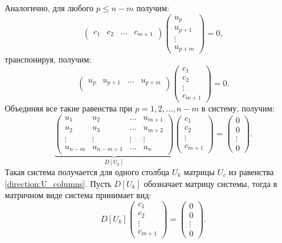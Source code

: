 Аналогично, для любого $p \le n-m$ получим:
\[
    \begin{pmatrix}
        c_1 & c_2 & \dots & c_{m+1}
    \end{pmatrix}
    \begin{pmatrix}
        u_p     \\
        u_{p+1} \\
        \vdots  \\
        u_{p+m}
    \end{pmatrix}
    = 0 ,
\]
транспонируя, получим:
\[
    \begin{pmatrix}
        u_p & u_{p+1} & \dots & u_{p+m} \\
    \end{pmatrix}
    \begin{pmatrix}
        c_1    \\
        c_2    \\
        \vdots \\
        c_{m+1}
    \end{pmatrix}
    = 0 .
\]
Объединяя все такие равенства при $p=1, 2, \dots, n-m$ в систему, получим:
\[
    \underbrace{
        \begin{pmatrix}
            u_1     & u_2       & \dots  & u_{m+1} \\
            u_2     & u_3       & \dots  & u_{m+2} \\
            \vdots  & \vdots    & \vdots & \vdots  \\
            u_{n-m} & u_{n-m+1} & \dots  & u_n
        \end{pmatrix}
    }_{D[U_k]}
    \begin{pmatrix}
        c_1    \\
        c_2    \\
        \vdots \\
        c_{m+1}
    \end{pmatrix}
    = \begin{pmatrix}
        0      \\
        0      \\
        \vdots \\
        0
    \end{pmatrix} .
\]
Такая система получается для одного столбца $U_k$ матрицы $U_c$ из равенства \eqref{direction:U_columns}. Пусть $D[U_k]$ обозначает матрицу системы,
тогда в матричном виде система принимает вид:
\[
    D[U_k]
    \begin{pmatrix}
        c_1    \\
        c_2    \\
        \vdots \\
        c_{m+1}
    \end{pmatrix}
    =
    \begin{pmatrix}
        0      \\
        0      \\
        \vdots \\
        0
    \end{pmatrix} .
\]
